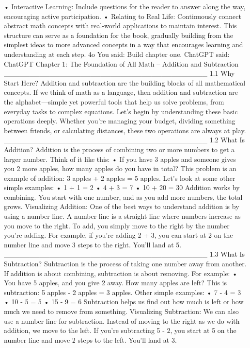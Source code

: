 •	Interactive Learning: Include questions for the reader to answer along the way, encouraging active participation.
•	Relating to Real Life: Continuously connect abstract math concepts with real-world applications to maintain interest.
This structure can serve as a foundation for the book, gradually building from the simplest ideas to more advanced concepts in a way that encourages learning and understanding at each step.
4o
You said:
Build chapter one. 
ChatGPT said:
ChatGPT
Chapter 1: The Foundation of All Math – Addition and Subtraction
________________________________________
1.1 Why Start Here?
Addition and subtraction are the building blocks of all mathematical concepts. If we think of math as a language, then addition and subtraction are the alphabet—simple yet powerful tools that help us solve problems, from everyday tasks to complex equations.
Let’s begin by understanding these basic operations deeply. Whether you’re managing your budget, dividing something between friends, or calculating distances, these two operations are always at play.
________________________________________
1.2 What Is Addition?
Addition is the process of combining two or more numbers to get a larger number. Think of it like this:
•	If you have 3 apples and someone gives you 2 more apples, how many apples do you have in total?
This problem is an example of addition: 3 apples + 2 apples = 5 apples.
Let’s look at some other simple examples:
•	1 + 1 = 2
•	4 + 3 = 7
•	10 + 20 = 30
Addition works by combining. You start with one number, and as you add more numbers, the total grows.
Visualizing Addition: One of the best ways to understand addition is by using a number line. A number line is a straight line where numbers increase as you move to the right. To add, you simply move to the right by the number you're adding.
For example, if you’re adding 2 + 3, you can start at 2 on the number line and move 3 steps to the right. You’ll land at 5.
________________________________________
1.3 What Is Subtraction?
Subtraction is the process of taking one number away from another. If addition is about combining, subtraction is about removing.
For example:
•	You have 5 apples, and you give 2 away. How many apples are left?
This is subtraction: 5 apples - 2 apples = 3 apples.
Other simple examples:
•	7 - 4 = 3
•	10 - 5 = 5
•	15 - 9 = 6
Subtraction helps us find out how much is left or how much we need to remove from something.
Visualizing Subtraction: We can also use a number line for subtraction. Instead of moving to the right as we do with addition, we move to the left.
If you’re subtracting 5 - 2, you start at 5 on the number line and move 2 steps to the left. You’ll land at 3.
